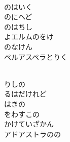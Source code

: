 \documentclass[10pt,b5j]{tarticle} %
\begin{document}
\vspace{1.5em} %
\newcommand{\linespace}{0.5em} %
\newcommand{\blocksize}{0.5\hsize} %
\newcommand{\itemmargin}{3em} %
\begin{enumerate} %
    \setlength{\itemindent}{\itemmargin} %
    \begin{minipage}[c]{\blocksize}
    
        \vspace{\linespace}
        \item~\\
        のはいく\\
        のにへど\\
        のはちし\\
        よエルムのをけ\\
        のなけん\\
        ペルアスペラとりく
        
    \end{minipage}
    \begin{minipage}[c]{\blocksize}
        
        \vspace{\linespace}
        \item~\\
        りしの\\
        るはだけれど\\
        はきの\\
        をわすこの\\
        かけていざかん\\
        アドアストラのの
        
    \end{minipage}
    \begin{minipage}[c]{\blocksize}
        

\end{minipage}
\end{enumerate}
\end{document}
